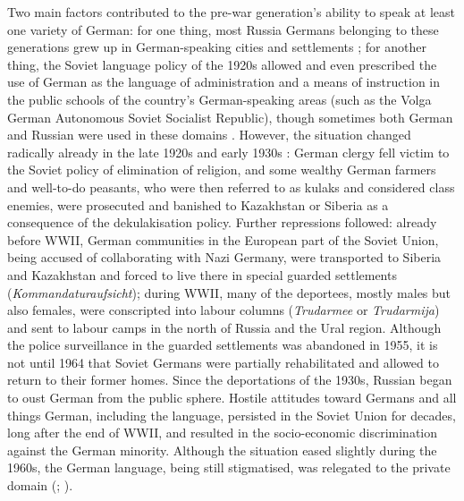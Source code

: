 Two main factors contributed to the pre-war generation's ability to speak at least one variety of German: for one thing, most  Russia Germans belonging to these generations grew up in German-speaking cities and settlements \citep[cf.][]{berend98}; for another thing, the Soviet language policy of the 1920s allowed and even prescribed the use of German as the language of administration and a means of instruction in the public schools of the country's German-speaking areas (such as the Volga German Autonomous Soviet Socialist Republic), though sometimes both German and Russian were used in these domains \citep[cf.][]{meng01,riehlTA}. However, the situation changed radically already in the late 1920s and early 1930s \citep[cf.][]{mukhina}: German clergy fell victim to the Soviet policy of elimination of religion, and some wealthy German farmers and well-to-do peasants, who were then referred to as kulaks and considered class enemies, were prosecuted and banished to Kazakhstan or Siberia as a consequence of the dekulakisation policy. Further repressions followed: already before WWII, German communities in the European part of the Soviet Union, being accused of collaborating with Nazi Germany, were transported to Siberia and Kazakhstan and forced to live there in special guarded settlements (\textit{Kommandaturaufsicht}); during WWII, many of the deportees, mostly males but also females, were conscripted into labour columns (\textit{Trudarmee} or \textit{Trudarmija}) and sent to labour camps in the north of Russia and the Ural region. Although the police surveillance in the guarded settlements was abandoned in 1955, it is not until 1964 that Soviet Germans were partially rehabilitated and allowed to return to their former homes. Since the deportations of the 1930s, Russian began to oust German from the public sphere. Hostile attitudes toward Germans and all things German, including the language, persisted in the Soviet Union for decades, long after the end of WWII, and resulted in the socio-economic discrimination against the German minority. Although the situation eased slightly during the 1960s, the German language, being still stigmatised, was relegated to the private domain (\citealt[49]{berend98}; \citealt[21]{blankenhorn}). 

